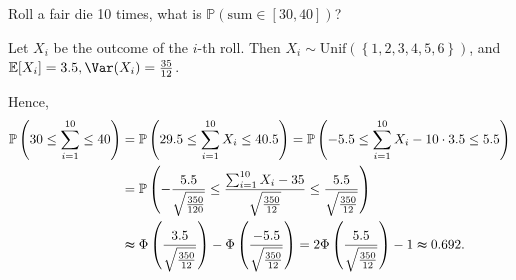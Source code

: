 \begin{eg}
    Roll a fair die 10 times, what is \(\mathbb{P} \left( \text{sum} \in [30, 40]  \right) \)? 
\end{eg}
\begin{explanation}
    Let \(X_i\) be the outcome of the \(i\)-th roll. Then \(X_i \sim \mathrm{Unif}(\left\{1, 2, 3, 4, 5, 6 \right\} ) \), and \(\mathbb{E} [X_i] = 3.5, \Var(X_i) = \frac{35}{12}\). 

    Hence,
    \begin{align*}
        \mathbb{P} \left( 30 \le \sum_{i=1}^{10} \le 40   \right) &= \mathbb{P} \left( 29.5 \le \sum_{i=1}^{10} X_i \le 40.5   \right) = \mathbb{P} \left( -5.5 \le \sum_{i=1}^{10} X_i - 10 \cdot 3.5 \le 5.5   \right) \\
        &= \mathbb{P} \left( -\frac{5.5}{\sqrt{\frac{350}{120}} } \le \frac{\sum_{i=1}^{10} X_i - 35 }{\sqrt{\frac{350}{12}} } \le \frac{5.5}{\sqrt{\frac{350}{12}} }  \right) \\
        &\thickapprox \Phi \left( \frac{3.5}{\sqrt{\frac{350}{12}} } \right) - \Phi \left( \frac{-5.5}{\sqrt{\frac{350}{12}} } \right) = 2 \Phi \left( \frac{5.5}{\sqrt{\frac{350}{12}} } \right) - 1 \thickapprox 0.692.      
    \end{align*} 
\end{explanation}